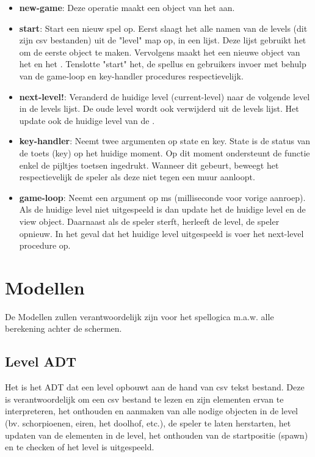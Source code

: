 \begin{itemize}
	\item \textbf{new-game}: Deze operatie maakt een object van het \texttt{} aan.
	\item \textbf{start}: Start een nieuw spel op.
		Eerst slaagt het alle namen van de levels (dit zijn csv bestanden) uit de "level" map op, in een lijst.
		Deze lijst gebruikt het om de eerste \texttt{} object te maken.
		Vervolgens maakt het een nieuwe object van het \texttt{} en het \texttt{}.
		Tenslotte "start" het, de spellus en gebruikers invoer met behulp van de game-loop en key-handler procedures respectievelijk. 
	\item \textbf{next-level!}: Veranderd de huidige level (current-level) naar de volgende level in de levels lijst.
		De oude level wordt ook verwijderd uit de levels lijst.
		Het update ook de huidige level van de \texttt{}.
	\item \textbf{key-handler}: Neemt twee argumenten op state en key.
		State is de status van de toets (key) op het huidige moment.
		Op dit moment ondersteunt de functie enkel de pijltjes toetsen ingedrukt.
		Wanneer dit gebeurt, beweegt het respectievelijk de speler als deze niet tegen een muur aanloopt.
	\item \textbf{game-loop}: Neemt een argument op ms (milliseconde voor vorige aanroep).
		Als de huidige level niet uitgespeeld is dan
		update het de huidige level en de view object.
		Daarnaast als de speler sterft, herleeft de level, de speler opnieuw.
		In het geval dat het huidige level uitgespeeld is voer het next-level procedure op.
\end{itemize}

\section{Modellen}
\label{model}
De Modellen zullen verantwoordelijk zijn voor het spellogica m.a.w. alle berekening achter de schermen.

\subsection{Level ADT}
\label{section:level}
Het \texttt{} is het ADT dat een level opbouwt aan de hand van csv tekst bestand.
Deze is verantwoordelijk om
een csv bestand te lezen en zijn elementen ervan te interpreteren,
het onthouden en aanmaken van alle nodige objecten in de level (bv. schorpioenen, eiren, het doolhof, etc.),
de speler te laten herstarten,
het updaten van de elementen in de level,
het onthouden van de startpositie (spawn)
en te checken of het level is uitgespeeld.

